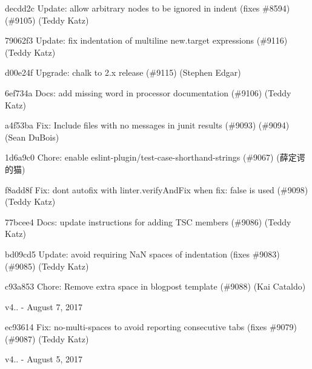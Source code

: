 \begin{DoxyItemize}
\item decdd2c Update\+: allow arbitrary nodes to be ignored in {\ttfamily indent} (fixes \#8594) (\#9105) (Teddy Katz)
\item 79062f3 Update\+: fix indentation of multiline {\ttfamily new.\+target} expressions (\#9116) (Teddy Katz)
\item d00e24f Upgrade\+: {\ttfamily chalk} to 2.\+x release (\#9115) (Stephen Edgar)
\item 6ef734a Docs\+: add missing word in processor documentation (\#9106) (Teddy Katz)
\item a4f53ba Fix\+: Include files with no messages in junit results (\#9093) (\#9094) (Sean Du\+Bois)
\item 1d6a9c0 Chore\+: enable eslint-\/plugin/test-\/case-\/shorthand-\/strings (\#9067) (薛定谔的猫)
\item f8add8f Fix\+: don\textquotesingle{}t autofix with linter.\+verify\+And\+Fix when {\ttfamily fix\+: false} is used (\#9098) (Teddy Katz)
\item 77bcee4 Docs\+: update instructions for adding T\+SC members (\#9086) (Teddy Katz)
\item bd09cd5 Update\+: avoid requiring NaN spaces of indentation (fixes \#9083) (\#9085) (Teddy Katz)
\item c93a853 Chore\+: Remove extra space in blogpost template (\#9088) (Kai Cataldo)
\end{DoxyItemize}

v4.. -\/ August 7, 2017


\begin{DoxyItemize}
\item ec93614 Fix\+: no-\/multi-\/spaces to avoid reporting consecutive tabs (fixes \#9079) (\#9087) (Teddy Katz)
\end{DoxyItemize}

v4.. -\/ August 5, 2017


